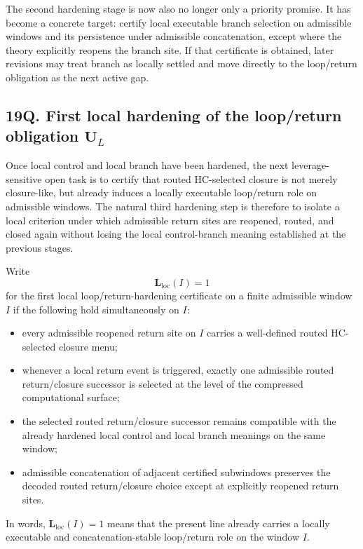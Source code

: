 \begin{corollary}
The second hardening stage is now also no longer only a priority promise. It has become a concrete target: certify local executable branch selection on admissible windows and its persistence under admissible concatenation, except where the theory explicitly reopens the branch site. If that certificate is obtained, later revisions may treat branch as locally settled and move directly to the loop/return obligation as the next active gap.
\end{corollary}


\subsection*{19Q. First local hardening of the loop/return obligation $\mathbf U_L$}
Once local control and local branch have been hardened, the next leverage-sensitive open task is to certify that routed HC-selected closure is not merely closure-like, but already induces a locally executable loop/return role on admissible windows. The natural third hardening step is therefore to isolate a local criterion under which admissible return sites are reopened, routed, and closed again without losing the local control-branch meaning established at the previous stages.

\begin{definition}
Write
\[
\mathbf L_{\mathrm{loc}}(I)=1
\]
for the first local loop/return-hardening certificate on a finite admissible window $I$ if the following hold simultaneously on $I$:
\begin{itemize}[leftmargin=2em]
  \item every admissible reopened return site on $I$ carries a well-defined routed HC-selected closure menu;
  \item whenever a local return event is triggered, exactly one admissible routed return/closure successor is selected at the level of the compressed computational surface;
  \item the selected routed return/closure successor remains compatible with the already hardened local control and local branch meanings on the same window;
  \item admissible concatenation of adjacent certified subwindows preserves the decoded routed return/closure choice except at explicitly reopened return sites.
\end{itemize}
In words, $\mathbf L_{\mathrm{loc}}(I)=1$ means that the present line already carries a locally executable and concatenation-stable loop/return role on the window $I$.
\end{definition}

